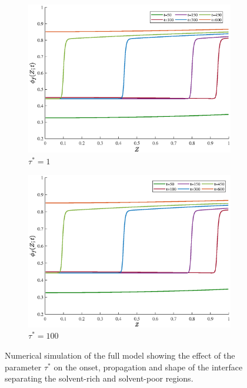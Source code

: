 \documentclass[12pt]{extarticle}
\begin{document}
\begin{figure}
	\begin{subfigure}{0.24\textwidth}
		\includegraphics[scale=0.19]{images/series1tau1}
		\caption{$\tau^*=1$}
	\end{subfigure}
\hspace{1mm}
	\begin{subfigure}{0.24\textwidth}
		\includegraphics[scale=0.18]{images/series1tau100}
		\caption{$\tau^*=100$}
	\end{subfigure}
\caption{Numerical simulation of the full model showing the effect of the parameter $\tau^*$ on the onset, propagation and shape of the interface separating the solvent-rich and solvent-poor regions.}
\label{series1}
\end{figure}
\end{document}
